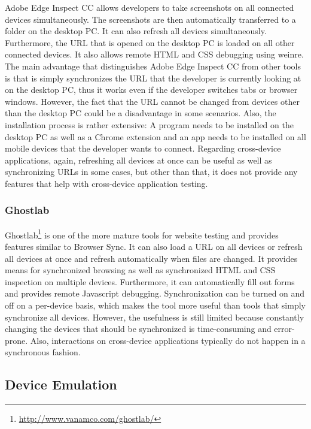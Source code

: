 Adobe Edge Inspect CC allows developers to take screenshots on all connected devices simultaneously. The screenshots are then automatically transferred to a folder on the desktop PC. It can also refresh all devices simultaneously. Furthermore, the URL that is opened on the desktop PC is loaded on all other connected devices. It also allows remote HTML and CSS debugging using weinre. The main advantage that distinguishes Adobe Edge Inspect CC from other tools is that is simply synchronizes the URL that the developer is currently looking at on the desktop PC, thus it works even if the developer switches tabs or browser windows. However, the fact that the URL cannot be changed from devices other than the desktop PC could be a disadvantage in some scenarios. Also, the installation process is rather extensive: A program needs to be installed on the desktop PC as well as a Chrome extension and an app needs to be installed on all mobile devices that the developer wants to connect. Regarding cross-device applications, again, refreshing all devices at once can be useful as well as synchronizing URLs in some cases, but other than that, it does not provide any features that help with cross-device application testing.

\subsubsection{Ghostlab}

Ghostlab\footnote{\url{http://www.vanamco.com/ghostlab/}} is one of the more mature tools for website testing and provides features similar to Browser Sync. It can also load a URL on all devices or refresh all devices at once and refresh automatically when files are changed. It provides means for synchronized browsing as well as synchronized HTML and CSS inspection on multiple devices. Furthermore, it can automatically fill out forms and provides remote Javascript debugging. Synchronization can be turned on and off on a per-device basis, which makes the tool more useful than tools that simply synchronize all devices. However, the usefulness is still limited because constantly changing the devices that should be synchronized is time-consuming and error-prone. Also, interactions on cross-device applications typically do not happen in a synchronous fashion.

\subsection{Device Emulation}


